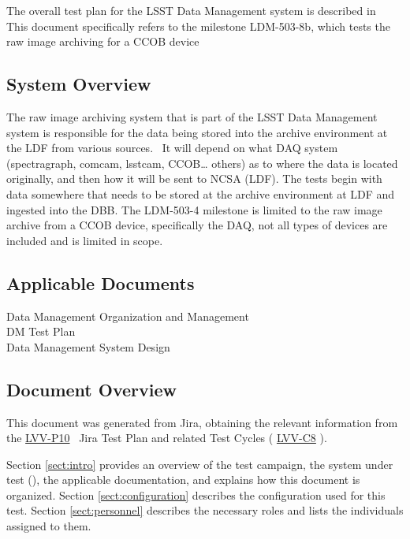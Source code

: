 \documentclass[DM,lsstdraft,STR,toc]{lsstdoc}
\begin{document}
The overall test plan for the LSST Data Management system is described
in \\
This document specifically refers to the milestone LDM-503-8b, which
tests the raw image archiving for a CCOB device



\subsection{System Overview}
\label{sect:systemoverview}

The raw image archiving system that is part of the LSST Data Management
system is responsible for the data being stored into the archive
environment at the LDF from various sources. ~It will depend on what DAQ
system (spectragraph, comcam, lsstcam, CCOB\ldots{} others) as to where
the data is located originally, and then how it will be sent to NCSA
(LDF). The tests begin with data somewhere that needs to be stored at
the archive environment at LDF and ingested into the DBB. The LDM-503-4
milestone is limited to the raw image archive from a CCOB device,
specifically the DAQ, not all types of devices are included and is
limited in scope.\\[2\baselineskip]

\subsection{Applicable Documents}\label{applicable-documents}

 Data Management Organization and Management\\
 DM Test Plan\\
 Data Management System Design


\subsection{Document Overview}
\label{sect:docoverview}

This document was generated from Jira, obtaining the relevant information from the 
\href{https://jira.lsstcorp.org/secure/Tests.jspa#/testPlan/LVV-P10}{LVV-P10}
~Jira Test Plan and related Test Cycles (
  \href{https://jira.lsstcorp.org/secure/Tests.jspa#/testCycle/LVV-C8}{LVV-C8}
).

Section \ref{sect:intro} provides an overview of the test campaign, the system under test (\product{}), the applicable documentation, and explains how this document is organized.
Section \ref{sect:configuration}  describes the configuration used for this test.
Section \ref{sect:personnel} describes the necessary roles and lists the individuals assigned to them.
\end{document}
